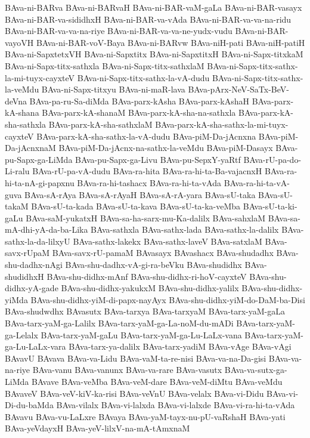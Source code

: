{BAva-ni-BARva
BAva-ni-BARvaH
BAva-ni-BAR-vaM-gaLa
BAva-ni-BAR-vasayx
BAva-ni-BAR-va-sididhxH
BAva-ni-BAR-va-vAda
BAva-ni-BAR-va-va-na-ridu
BAva-ni-BAR-va-va-na-riye
BAva-ni-BAR-va-va-ne-yudx-vudu
BAva-ni-BAR-vayoVH
BAva-ni-BAR-voV-Baya
BAva-ni-BARvw
BAva-niH-pati
BAva-niH-patiH
BAva-ni-SapxtetxVH
BAva-ni-Sapxtitx
BAva-ni-SapxtitxH
BAva-ni-Sapx-titxkaM
BAva-ni-Sapx-titx-sathxla
BAva-ni-Sapx-titx-sathxlaM
BAva-ni-Sapx-titx-sathx-la-mi-tuyx-cayxteV
BAva-ni-Sapx-titx-sathx-la-vA-dudu
BAva-ni-Sapx-titx-sathx-la-veMdu
BAva-ni-Sapx-titxyu
BAva-ni-maR-lava
BAva-pArx-NeV-SaTx-BeV-deVna
BAva-pa-ru-Sa-diMda
BAva-parx-kAsha
BAva-parx-kAshaH
BAva-parx-kA-shana
BAva-parx-kA-shanaM
BAva-parx-kA-sha-na-sathxla
BAva-parx-kA-sha-sathxla
BAva-parx-kA-sha-sathxlaM
BAva-parx-kA-sha-sathx-la-mi-tuyx-cayxteV
BAva-parx-kA-sha-sathx-la-vA-dudu
BAva-piM-Da-jAcnxna
BAva-piM-Da-jAcnxnaM
BAva-piM-Da-jAcnx-na-sathx-la-veMdu
BAva-piM-Dasayx
BAva-pu-Sapx-ga-LiMda
BAva-pu-Sapx-ga-Livu
BAva-pu-SepxY-yaRtf
BAva-rU-pa-do-Li-ralu
BAva-rU-pa-vA-dudu
BAva-ra-hita
BAva-ra-hi-ta-Ba-vajacnxH
BAva-ra-hi-ta-nA-gi-papxnu
BAva-ra-hi-tashacx
BAva-ra-hi-ta-vAda
BAva-ra-hi-ta-vA-guva
BAva-sA-rAya
BAva-sA-rAyaH
BAva-sA-rA-yara
BAva-sU-taka
BAva-sU-takaM
BAva-sU-ta-kada
BAva-sU-ta-kava
BAva-sU-ta-ka-veMba
BAva-sU-ta-ki-gaLu
BAva-saM-yukatxH
BAva-sa-ha-sarx-mu-Ka-dalilx
BAva-sahxlaM
BAva-sa-mA-dhi-yA-da-ba-Lika
BAva-sathxla
BAva-sathx-lada
BAva-sathx-la-dalilx
BAva-sathx-la-da-lilxyU
BAva-sathx-lakekx
BAva-sathx-laveV
BAva-satxlaM
BAva-savx-rUpaM
BAva-savx-rU-pamaM
BAvasayx
BAvashacx
BAva-shudadhx
BAva-shu-dadhx-nAgi
BAva-shu-dadhx-vA-gi-ra-beVku
BAva-shudidhx
BAva-shudidhxH
BAva-shu-didhx-mAnf
BAva-shu-didhx-ri-hoV-cayxteV
BAva-shu-didhx-yA-gade
BAva-shu-didhx-yakukxM
BAva-shu-didhx-yalilx
BAva-shu-didhx-yiMda
BAva-shu-didhx-yiM-di-papx-nayAyx
BAva-shu-didhx-yiM-do-DaM-ba-Disi
BAva-shudwdhx
BAvasutx
BAva-tarxya
BAva-tarxyaM
BAva-tarx-yaM-gaLa
BAva-tarx-yaM-ga-Lalilx
BAva-tarx-yaM-ga-La-noM-du-mADi
BAva-tarx-yaM-ga-Lelalx
BAva-tarx-yaM-gaLu
BAva-tarx-yaM-ga-Lu-LaLx-vana
BAva-tarx-yaM-ga-Lu-LaLx-vara
BAva-tarx-ya-dalilx
BAva-tarx-yadiM
BAva-vAge
BAva-vAgi
BAvavU
BAvava
BAva-va-Lidu
BAva-vaM-ta-re-nisi
BAva-va-na-Da-gisi
BAva-va-na-riye
BAva-vanu
BAva-vanunx
BAva-va-rare
BAva-vasutx
BAva-va-sutx-ga-LiMda
BAvave
BAva-veMba
BAva-veM-dare
BAva-veM-diMtu
BAva-veMdu
BAvaveV
BAva-veV-kiV-ka-risi
BAva-veVnU
BAva-velalx
BAva-vi-Didu
BAva-vi-Di-du-baMda
BAva-vilalx
BAva-vi-lalxda
BAva-vi-lalxde
BAva-vi-ra-hi-ta-vAda
BAvavu
BAva-vu-LaLxre
BAvaya
BAva-yaM-tayx-nu-pU-vaRshaH
BAva-yati
BAva-yeVdayxH
BAva-yeV-lilxV-na-mA-tAmxnaM
}
